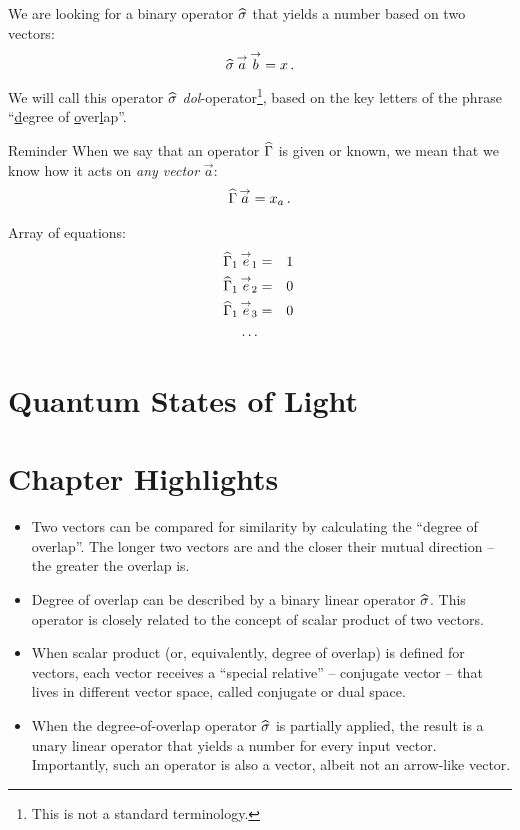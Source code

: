 We are looking for a binary operator $\widehat{\sigma}$ that yields a number
based on two vectors:
\[
\widehat{\sigma}\,\overset{\rightarrow}{a}\,\overset{\rightarrow}{b}=x\,.
\]
We will call this operator $\widehat{\sigma}$ \emph{dol}-operator\footnote{This is not a
standard terminology. }, based on the key letters of the phrase
``\underline{d}egree of \underline{o}ver\underline{l}ap''.

\begin{myrem}{Reminder}
When we say that an operator $\widehat{\Gamma}$ is given or known, we
mean that we know how it acts on \emph{any vector} $\vec{a}$:
\[
\widehat{\Gamma}\,\overset{\rightarrow}{a} = x_a\,.
\]
\end{myrem}

Array of equations:
\begin{eqnarray}
  \widehat{\Gamma}_1\,\overset{\rightarrow}{e}_1 & = & 1\,\\
  \widehat{\Gamma}_1\,\overset{\rightarrow}{e}_2 & = & 0\,\\
  \widehat{\Gamma}_1\,\overset{\rightarrow}{e}_3 & = & 0\,\\
  \ldots
\end{eqnarray}

\section{Quantum States of Light}

\section*{Chapter Highlights}
{\chhc
  \it
\begin{itemize}
\item Two vectors can be compared for similarity by calculating the
  ``degree of overlap''. The longer two vectors are and the closer
  their mutual direction -- the greater the overlap is.
\item Degree of overlap can be described by a binary linear operator
  $\widehat{\sigma}$. This operator is closely related to the concept of
  scalar product of two vectors.
\item When scalar product (or, equivalently, degree of overlap) is
  defined for vectors, each vector receives a ``special relative'' --
  conjugate vector -- that lives in different vector space, called
  conjugate or dual space.
\item When the degree-of-overlap operator $\widehat{\sigma}$ is partially
  applied, the result is a unary linear operator that yields a number
  for every input vector. Importantly, such an operator is also a
  vector, albeit not an arrow-like vector.
\end{itemize}

}
